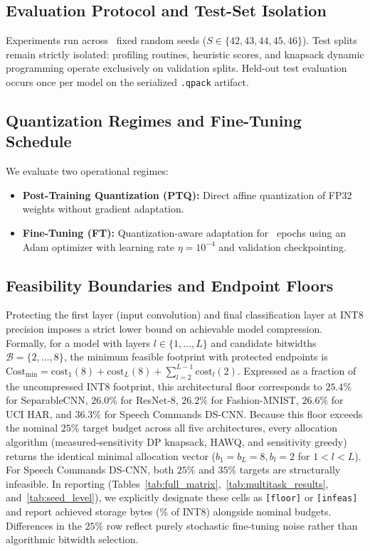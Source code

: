 \documentclass{ieeeaccess}
\begin{document}
\subsection{Evaluation Protocol and Test-Set Isolation}
Experiments run across \MacroNumANOVASeeds\ fixed random seeds ($S \in \{42, 43, 44, 45, 46\}$). Test splits remain strictly isolated: profiling routines, heuristic scores, and knapsack dynamic programming operate exclusively on validation splits. Held-out test evaluation occurs once per model on the serialized \texttt{.qpack} artifact.

\subsection{Quantization Regimes and Fine-Tuning Schedule}
We evaluate two operational regimes:
\begin{itemize}
    \item \textbf{Post-Training Quantization (PTQ):} Direct affine quantization of FP32 weights without gradient adaptation.
    \item \textbf{Fine-Tuning (FT):} Quantization-aware adaptation for \MacroFTEpochs\ epochs using an Adam optimizer with learning rate $\eta = 10^{-4}$ and validation checkpointing.
\end{itemize}

\subsection{Feasibility Boundaries and Endpoint Floors}
Protecting the first layer (input convolution) and final classification layer at INT8 precision imposes a strict lower bound on achievable model compression. Formally, for a model with layers $l \in \{1, \dots, L\}$ and candidate bitwidths $\mathcal{B} = \{2, \dots, 8\}$, the minimum feasible footprint with protected endpoints is $\text{Cost}_{\text{min}} = \text{cost}_1(8) + \text{cost}_L(8) + \sum_{l=2}^{L-1} \text{cost}_l(2)$. Expressed as a fraction of the uncompressed INT8 footprint, this architectural floor corresponds to $25.4\%$ for SeparableCNN, $26.0\%$ for ResNet-8, $26.2\%$ for Fashion-MNIST, $26.6\%$ for UCI HAR, and $36.3\%$ for Speech Commands DS-CNN. Because this floor exceeds the nominal $25\%$ target budget across all five architectures, every allocation algorithm (measured-sensitivity DP knapsack, HAWQ, and sensitivity greedy) returns the identical minimal allocation vector ($b_1 = b_L = 8, b_l = 2$ for $1 < l < L$). For Speech Commands DS-CNN, both $25\%$ and $35\%$ targets are structurally infeasible. In reporting (Tables~\ref{tab:full_matrix},~\ref{tab:multitask_results}, and~\ref{tab:seed_level}), we explicitly designate these cells as \texttt{[floor]} or \texttt{[infeas]} and report achieved storage bytes (\% of INT8) alongside nominal budgets. Differences in the $25\%$ row reflect purely stochastic fine-tuning noise rather than algorithmic bitwidth selection.
\end{document}
